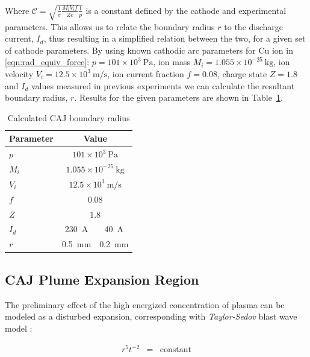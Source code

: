 \documentclass[a4paper]{iacas}%
\begin{document}
Where $\mathcal{C} = \sqrt{\frac{1}{\pi}\frac{M_i V_i f}{Z e}\frac{1}{p}}$ is a constant defined by the cathode and experimental parameters. This allows us to relate the boundary radius $r$ to the discharge current, $I_d$, thus resulting in a simplified relation between the two, for a given set of cathode parameters. By using known cathodic arc parameters for Cu ion in \eqref{eqn:rad_equiv_force}: $p = 101 \times 10^3~\mathrm{Pa}$, ion mass $M_i = 1.055 \times 10^{-25}~\mathrm{kg}$, ion velocity $V_i = 12.5 \times 10^3~\mathrm{m/s}$, ion current fraction $f=0.08$, charge state $Z = 1.8$ and $I_d$ values measured in previous experiments \cite{KR,KRClose} we can calculate the resultant boundary radius, $r$. Results for the given parameters are shown in Table~\ref{t:radii}. 

\begin{table}[hbt]
	\begin{center}
		\begin{threeparttable}
			\caption{Calculated CAJ boundary radius}
			\label{t:radii}
			\begin{tabular}{lc|c}
				Parameter &
				\multicolumn{2}{c}{Value}\\\hline
				$p$ & \multicolumn{2}{c}{$101 \times 10^3~\mathrm{Pa} $} \\
				$M_i$  	& \multicolumn{2}{c}{$1.055 \times 10^{-25}~\mathrm{kg} $}  \\
				$V_i$ 	& \multicolumn{2}{c}{$12.5 \times 10^3~\mathrm{m/s} $}  \\
				$f$ 	& \multicolumn{2}{c}{$0.08 $} \\
				$Z$	& \multicolumn{2}{c}{$1.8 $} \\
				$I_d$  & 230~A & 40~A\\
				$r$ 	& 0.5~mm & 0.2~mm
			\end{tabular}
		\end{threeparttable}
	\end{center}
\end{table}

\subsection{CAJ Plume Expansion Region}\label{subs:CAJ_expansion}

The preliminary effect of the high energized concentration of plasma can be modeled \cite{KR} as a disturbed expansion, corresponding with \emph{Taylor-Sedov} blast wave model \cite{TAYLOR,SEDOV}: 

\begin{eqnarray}\label{eqn:taylor_sedov}
r^5 t^{-2} &=& \mathrm{constant}
\end{eqnarray}
\end{document}
